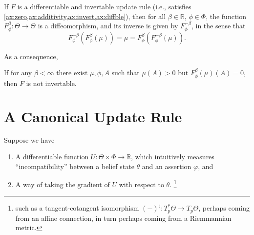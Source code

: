 \documentclass{article}
\begin{document}
\begin{prop}
    If $F$ is a differentiable and invertable update rule (i.e., satisfies \cref{ax:zero,ax:additivity,ax:invert,ax:diffble}), then for all $\beta \in \mathbb R$, $\phi \in \Phi$, the function
    $F^\beta_\phi : \Theta \to \Theta$
    is a diffeomorphism, and its inverse is given by $F^{-\beta}_\phi$, in the sense that
    \[
        F^{-\beta}_\phi( F^{\beta}_\phi (\mu) ) = \mu = F^{\beta}_\phi( F^{-\beta}_\phi (\mu) ).
     \]
\end{prop}




As a consequence,
\begin{coro}
    If for any $\beta < \infty$ there exist $\mu, \phi, A$ such that
    $\mu(A) > 0$  but $F^{\beta}_\phi(\mu)(A) = 0$, then $F$ is not invertable.
\end{coro}


%

\section{A Canonical Update Rule}
Suppose we have
\begin{enumerate}[nosep]
    \item A differentiable function $U : \Theta \times \Phi  \to \mathbb R$, which intuitively measures ``incompatibility'' between a belief state $\theta$ and an assertion $\varphi$, and
    \item
        A way of taking the gradient of $U$ with respect to $\theta$.%
            \footnote{
            such as a tangent-cotangent isomorphism $(-)^\sharp : T^*_p\Theta \to T_p \Theta$, perhaps coming from an affine connection, in turn perhaps coming from a Riemmannian metric.}
\end{enumerate}
\def\GD#1{\mathtt{GF}[#1]}
\def\NGD#1{\mathtt{NGF}[#1]}
\end{document}
